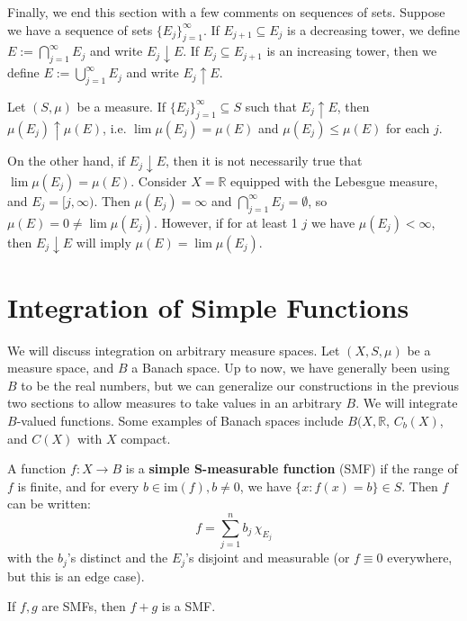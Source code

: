 	Finally, we end this section with a few comments on sequences of sets. Suppose we have a sequence of sets 
	$\{E_j\}_{j = 1}^\infty$. If $E_{j + 1}\subseteq E_j$ is a decreasing tower, we define $E := \bigcap_{j = 1}^\infty E_j$ and
	write $E_j\downarrow E$. If $E_j\subseteq E_{j + 1}$ is an increasing tower, then we define 
	$E := \bigcup_{j = 1}^\infty E_j$ and write $E_j\uparrow E$.
	
	\begin{prop}
		Let $(S, \mu)$ be a measure. If $\{E_j\}_{j = 1}^\infty\subseteq S$ such that $E_j\uparrow E$, then 
		$\mu(E_j)\uparrow\mu(E)$, i.e. $\lim\mu(E_j) = \mu(E)$ and $\mu(E_j)\leq\mu(E)$ for each $j$. 
	\end{prop}
	
	On the other hand, if $E_j\downarrow E$, then it is not necessarily true that $\lim\mu(E_j) = \mu(E)$. Consider $X = 
	\mathbb R$ equipped with the Lebesgue measure, and $E_j = [j, \infty)$. Then $\mu(E_j) = \infty$ and 
	$\bigcap_{j = 1}^\infty E_j = \emptyset$, so $\mu(E) = 0\neq\lim\mu(E_j)$. However, if for at least 1 $j$ we have $\mu(E_j) < 
	\infty$, then $E_j\downarrow E$ will imply $\mu(E) = \lim\mu(E_j)$. 
	
\section{Integration of Simple Functions}
	
	We will discuss integration on arbitrary measure spaces. Let $(X, S, \mu)$ be a measure space, and $B$ a Banach 
	space. Up to now, we have generally been using $B$ to be the real numbers, but we can generalize our constructions 
	in the previous two sections to allow measures to take values in an arbitrary $B$. We will integrate $B$-valued functions. 
	Some examples of Banach spaces include $B(X, \mathbb R$, $C_b(X)$, and $C(X)$ with $X$ compact. 
	
	\begin{definition}
		A function $f : X\rightarrow B$ is a \textbf{simple S-measurable function} (SMF) if the range of $f$ is finite, and for 
		every $b\in \mathrm{im}(f), b\neq 0$, we have $\{x : f(x) = b\}\in S$. Then $f$ can be written:
		$$
			f = \sum_{j = 1}^n b_j \, \chi_{E_j}
		$$
		with the $b_j$'s distinct and the $E_j$'s disjoint and measurable (or $f\equiv 0$ everywhere, but this is an edge 
		case).
	\end{definition}
	
	\begin{prop}
		If $f, g$ are SMFs, then $f + g$ is a SMF.
	\end{prop}
	
